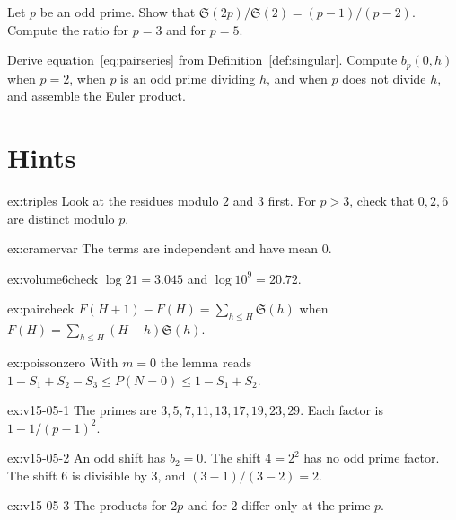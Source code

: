 \begin{exercise}[$\star$]\label{ex:v15-05-3}
Let \(p\) be an odd prime. Show that \(\mathfrak S(2p)/\mathfrak S(2)=(p-1)/(p-2)\). Compute the ratio for \(p=3\) and for \(p=5\).
\end{exercise}

\begin{exercise}[$\star\star\star$]\label{ex:v15-05-4}
Derive equation~\eqref{eq:pairseries} from Definition~\ref{def:singular}. Compute \(b_p(0,h)\) when \(p=2\), when \(p\) is an odd prime dividing \(h\), and when \(p\) does not divide \(h\), and assemble the Euler product.
\end{exercise}

\section{Hints}

\begin{hint}{ex:triples}
Look at the residues modulo $2$ and $3$ first. For $p>3$, check that $0,2,6$ are distinct modulo $p$.
\end{hint}
\begin{hint}{ex:cramervar}
The terms are independent and have mean $0$.
\end{hint}
\begin{hint}{ex:volume6check}
$\log21=3.045$ and $\log10^9=20.72$.
\end{hint}
\begin{hint}{ex:paircheck}
$F(H+1)-F(H)=\sum_{h\le H}\mathfrak S(h)$ when $F(H)=\sum_{h\le H}(H-h)\mathfrak S(h)$.
\end{hint}
\begin{hint}{ex:poissonzero}
With $m=0$ the lemma reads $1-S_1+S_2-S_3\le P(N=0)\le1-S_1+S_2$.
\end{hint}

\begin{hint}{ex:v15-05-1}
The primes are \(3,5,7,11,13,17,19,23,29\). Each factor is \(1-1/(p-1)^2\).
\end{hint}

\begin{hint}{ex:v15-05-2}
An odd shift has \(b_2=0\). The shift \(4=2^2\) has no odd prime factor. The shift \(6\) is divisible by \(3\), and \((3-1)/(3-2)=2\).
\end{hint}

\begin{hint}{ex:v15-05-3}
The products for \(2p\) and for \(2\) differ only at the prime \(p\).
\end{hint}

